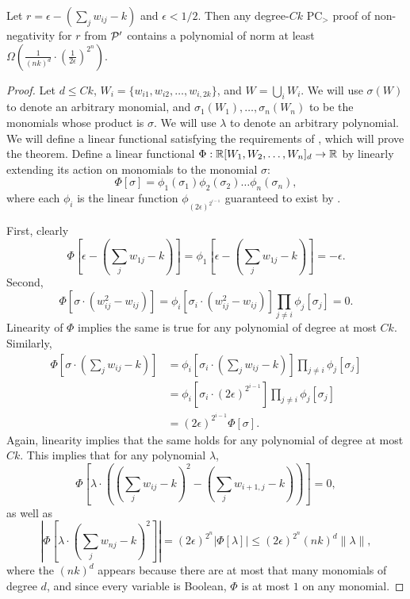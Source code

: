 \begin{lemma}\label{lem:boolean-complex}
Let $r = \epsilon - \left(\sum_j w_{ij} - k\right)$ and $\epsilon < 1/2$. Then any degree-$Ck$ PC$_>$ proof of non-negativity for $r$ from $\mathcal P'$ contains a polynomial of norm at least $\Omega\left(\frac{1}{(nk)^d} \cdot \left(\frac{1}{2\epsilon}\right)^{2^n}\right)$.
\end{lemma}
\begin{proof}
Let $d \leq Ck$, $W_i = \{w_{i1}, w_{i2}, \dots, w_{i,2k}\}$, and $W = \bigcup_i W_i$. We will use $\sigma(W)$ to denote an arbitrary monomial, and $\sigma_1(W_1),\dots,\sigma_n(W_n)$ to be the monomials whose product is $\sigma$. We will use $\lambda$ to denote an arbitrary polynomial. We will define a linear functional satisfying the requirements of , which will prove the theorem. Define a linear functional $\Phi: \mathbb R[W_1,W_2,\dots,W_n]_d \rightarrow \mathbb R$ by linearly extending its action on monomials to the monomial $\sigma$:
\[\Phi[\sigma] = \phi_1(\sigma_1)\phi_2(\sigma_2)\dots\phi_n(\sigma_n),\]
where each $\phi_i$ is the linear function $\phi_{(2\epsilon)^{2^{i-1}}}$ guaranteed to exist by .

First, clearly 
\[\Phi\left[\epsilon - \left(\sum_j w_{1j} - k\right)\right] = \phi_1\left[\epsilon - \left(\sum_j w_{1j} - k\right)\right] = -\epsilon.\]
Second, 
\[\Phi\left[\sigma\cdot(w_{ij}^2 - w_{ij})\right] = \phi_i\left[\sigma_i\cdot (w_{ij}^2 - w_{ij})\right]\prod_{j \neq i}\phi_j[\sigma_j] = 0.\] 
Linearity of $\Phi$ implies the same is true for any polynomial of degree at most $Ck$. Similarly, 
\begin{align*}
\Phi\left[\sigma\cdot\left(\sum_j w_{ij} - k\right)\right] &= \phi_i\left[\sigma_i \cdot \left(\sum_j w_{ij} - k\right)\right]\prod_{j \neq i}\phi_j[\sigma_j] \\
&= \phi_i\left[\sigma_i \cdot (2\epsilon)^{2^{i-1}}\right] \prod_{j \neq i}\phi_j[\sigma_j] \\
&= (2\epsilon)^{2^{i-1}} \Phi[\sigma].
\end{align*}
Again, linearity implies that the same holds for any polynomial of degree at most $Ck$. This implies that for any polynomial $\lambda$, 
\[\Phi\left[\lambda\cdot \left(\left(\sum_{j} w_{ij} - k\right)^2 - \left(\sum_j w_{i+1,j} - k\right)\right)\right] = 0,\]
as well as
\[\left|\Phi\left[\lambda \cdot \left(\sum_j w_{nj} - k\right)^2\right]\right| = (2\epsilon)^{2^n}\left|\Phi[\lambda]\right| \leq (2\epsilon)^{2^n}(nk)^d\|\lambda\|,\]
where the $(nk)^d$ appears because there are at most that many monomials of degree $d$, and since every variable is Boolean, $\Phi$ is at most $1$ on any monomial. 


\end{proof}
